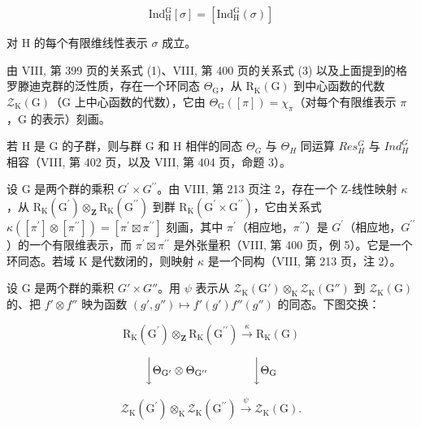 \[
\mathrm{Ind} _ {\mathrm{H}} ^ {\mathrm{G}} [ \sigma ] = [ \mathrm{Ind} _ {\mathrm{H}} ^ {\mathrm{G}} (\sigma) ]\tag{7}
\]

对 H 的每个有限维线性表示 \(\sigma\) 成立。

由 VIII, 第 399 页的关系式 (1)、VIII, 第 400 页的关系式 (3) 以及上面提到的格罗滕迪克群的泛性质，存在一个环同态 \(\Theta_{\mathrm{G}}\)，从 \(\mathrm{R}_{\mathrm{K}}(\mathrm{G})\) 到中心函数的代数 \(\mathcal{Z}_{\mathrm{K}}(\mathrm{G})\)（\(\mathrm{G}\) 上中心函数的代数），它由 \(\Theta_{\mathrm{G}}([\pi]) = \chi_{\pi}\)（对每个有限维表示 \(\pi\)，\(\mathrm{G}\) 的表示）刻画。

若 H 是 G 的子群，则与群 G 和 H 相伴的同态 \(\Theta_{G}\) 与 \(\Theta_{H}\) 同运算 \(Res_{H}^{G}\) 与 \(Ind_{H}^{G}\) 相容（VIII, 第 402 页，以及 VIII, 第 404 页，命题 3）。

设 G 是两个群的乘积 \(G^{\prime} \times G^{\prime\prime}\)。由 VIII, 第 213 页注 2，存在一个 Z-线性映射 \(\kappa\)，从 \(\mathrm{R}_{\mathrm{K}}(\mathrm{G}^{\prime}) \otimes_{\mathbf{Z}} \mathrm{R}_{\mathrm{K}}(\mathrm{G}^{\prime\prime})\) 到群 \(\mathrm{R}_{\mathrm{K}}(\mathrm{G}^{\prime} \times \mathrm{G}^{\prime\prime})\)，它由关系式 \(\kappa([\pi^{\prime}] \otimes [\pi^{\prime\prime}]) = [\pi^{\prime} \boxtimes \pi^{\prime\prime}]\) 刻画，其中 \(\pi^{\prime}\)（相应地，\(\pi^{\prime\prime}\)）是 \(G^{\prime}\)（相应地，\(G^{\prime\prime}\)）的一个有限维表示，而 \(\pi^{\prime} \boxtimes \pi^{\prime\prime}\) 是外张量积（VIII, 第 400 页，例 5）。它是一个环同态。若域 K 是代数闭的，则映射 \(\kappa\) 是一个同构（VIII, 第 213 页，注 2）。

设 G 是两个群的乘积 \(G' \times G''\)。用 \(\psi\) 表示从 \(\mathcal{Z}_{\mathrm{K}}(\mathrm{G}') \otimes_{\mathrm{K}} \mathcal{Z}_{\mathrm{K}}(\mathrm{G}'' )\) 到 \(\mathcal{Z}_{\mathrm{K}}(\mathrm{G})\) 的、把 \(f' \otimes f''\) 映为函数 \((g', g'') \mapsto f'(g')f''(g'')\) 的同态。下图交换：

\[
\mathrm{R} _ {\mathrm{K}} (\mathrm{G} ^ {\prime}) \otimes_ {\mathbf {Z}} \mathrm{R} _ {\mathrm{K}} (\mathrm{G} ^ {\prime \prime}) \xrightarrow {\kappa} \mathrm{R} _ {\mathrm{K}} (\mathrm{G})
\]

\[
\bigg \downarrow \Theta_ {\mathrm{G} ^ {\prime}} \otimes \Theta_ {\mathrm{G} ^ {\prime \prime}} \qquad \qquad \bigg \downarrow \Theta_ {\mathrm{G}}
\]

\[
\mathcal {Z} _ {\mathrm{K}} (\mathrm{G} ^ {\prime}) \otimes_ {\mathrm{K}} \mathcal {Z} _ {\mathrm{K}} (\mathrm{G} ^ {\prime \prime}) \xrightarrow {\psi} \mathcal {Z} _ {\mathrm{K}} (\mathrm{G}).
\]

